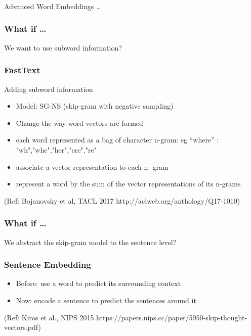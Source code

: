 \begin{frame}[fragile]\frametitle{}

\begin{center}
{\Large Advanced Word Embeddings \ldots}
\end{center}
\end{frame}


\begin{frame}[fragile]\frametitle{What if \ldots}
We want to use subword
information?
\end{frame}

\begin{frame}[fragile]\frametitle{FastText}
Adding subword information
\begin{itemize}
\item  Model: SG-NS (skip-gram with negative sampling)
\item Change the way word vectors are formed
\item  each word represented as a bag of character 
n-gram: eg ``where'' : "wh","whe","her","ere","re"
\item  associate a vector representation to each n-
gram 
\item  represent a word by the sum of the vector 
representations of its n-grams
\end{itemize}

{\tiny (Ref: Bojanovsky et al, TACL 2017 http://aclweb.org/anthology/Q17-1010)}

\end{frame}

\begin{frame}[fragile]\frametitle{What if \ldots}
We abstract the skip-gram 
model to the sentence level?
\end{frame}

\begin{frame}[fragile]\frametitle{Sentence Embedding}

\begin{itemize}
\item  Before: use a word to predict its 
surrounding context
\item Now: encode a sentence to predict 
the sentences around it 
\end{itemize}

{\tiny (Ref: Kiros et al., NIPS 2015 https://papers.nips.cc/paper/5950-skip-thought-vectors.pdf)}
\end{frame}


